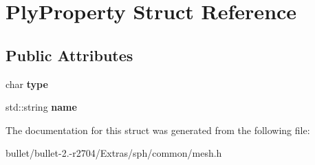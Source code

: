 \hypertarget{struct_ply_property}{\section{Ply\+Property Struct Reference}
\label{struct_ply_property}
}
\subsection*{Public Attributes}
\begin{DoxyCompactItemize}
\item 
\hypertarget{struct_ply_property_a249728809ac6a3cb76a9a498b4f839bd}{char {\bfseries type}}\label{struct_ply_property_a249728809ac6a3cb76a9a498b4f839bd}

\item 
\hypertarget{struct_ply_property_a8117a32c81663f9bd6312c24876d4e6a}{std\+::string {\bfseries name}}\label{struct_ply_property_a8117a32c81663f9bd6312c24876d4e6a}

\end{DoxyCompactItemize}


The documentation for this struct was generated from the following file\+:\begin{DoxyCompactItemize}
\item 
bullet/bullet-\/2.-\/r2704/\+Extras/sph/common/mesh.\+h\end{DoxyCompactItemize}
